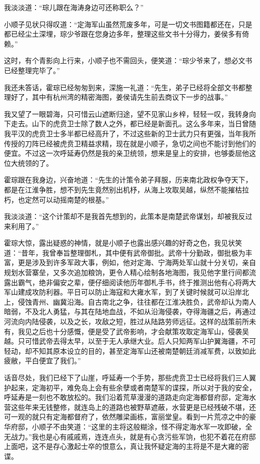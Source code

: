 我淡淡道：“琮儿跟在海涛身边可还称职么？”

小顺子见状只得叹道：“定海军山虽然荒废多年，可是一切文书图籍都还在，只是都已经尘土深埋，琮少爷跟在您身边多年，整理这些文书十分得力，姜侯多有倚赖。”

这时，有个青影向上行来，小顺子也不需回头，便笑道：“琮少爷来了，想必文书已经整理完毕了。”

我还未答话，霍琮已经匆匆到来，深施一礼道：“先生，弟子已经将全部文书都整理好了，其中有杭州湾的精密海图，姜侯请先生前去商议下一步的战事。”

我又望了一眼碧海，只可惜云山遮断归途，望不见家山乡梓，轻轻一叹，我转身向下走去。山下的虎贲卫士除了数人之外，都已经是新面孔。这么多年来，当日曾随我平汉的虎贲卫士多半都已经高升了，不过这些新的卫士武力只有更强，当年我所传授的刀阵已经被虎贲卫精益求精，现在就是小顺子，急切之间也不能讨到他们的便宜。不过这一次呼延寿仍然是我的亲卫统领，想来是皇上的安排，也够委屈他这位大统领的了。

霍琮跟在我身边，兴奋地道：“先生的计策令弟子拜服，历来南北政权争夺天下，都是在江淮争胜，想不到先生竟然别出机杼，从海上攻取吴越，纵然不能摧枯拉朽，也定然可以动摇南楚的根基。”

我淡淡道：“这个计策却不是我首先想到的，此策本是南楚武帝谋划，却被我反过来利用了。”

霍琮大惊，露出疑惑的神情，就是小顺子也露出感兴趣的好奇之色，我见状笑道：“昔年，我曾奉旨整理御札，其中便有武帝御批。武帝十分勤政，御批极为丰富，更是涉及到许多军政大事，例如，他对定海、宁海两处军山就十分关切，亲自规划水营寨垒，又多次追加粮饷，更令人精心绘制各地海图，我见他字里行间都流露出霸气，绝非偏安之辈，便仔细阅读他历年御札手书，终于推测出他有心将两大军山建成攻防利器。平日可以防止海寇和大雍水军，到了关键时候就可以沿岸北上，侵蚀青州、幽冀沿海。自古南北之争，往往都在江淮决胜负，武帝却认为南人暗弱，不及北人勇猛，与其在陆地血战，不如从沿海侵袭，夺得海疆之后，再通过河流向内陆侵袭，以及之长，攻敌之短，胜过从陆路劳师远征。这样的战策前所未有，我见之后也十分感慨，便是受了武帝影响，才会献策攻取定海军山，侵袭吴越。只可惜武帝去得太早，以至于无人承继大业。后人只知两军山护翼海疆，不可轻动，却不知其原本设立的目的，甚至定海军山还被南楚朝廷消减军费，以致如此疲敝，平白便宜了我们。”

话音尽处，我们已经下了山崖，呼延寿一个手势，那些虎贲卫士已经将我们三人翼护起来，定海初平，难免岛上会有些余孽或者南楚军的谍探，所以对于我的安全，呼延寿是一刻也不敢放松的。我们沿着荒草漫漫的道路走向定海都督府邸，定海水营这些年来无钱整修，就连岛上的道路也被野草遮蔽，水营更是已经残破不堪，还可一观的就只有定海都督府了，依然雕梁画栋，富丽堂皇。看到一片荒凉之中的豪华府邸，小顺子不由笑道：“这里的主将这般糊涂，怪不得定海水军一攻即破，全无战力。”我也是心有戚戚焉，连连点头，就是有心贪污些军饷，也犯不着花在府邸上面吧，这不是存心激起士卒的恨意么，真让我怀疑定海的主将是不是大雍的密谍。

